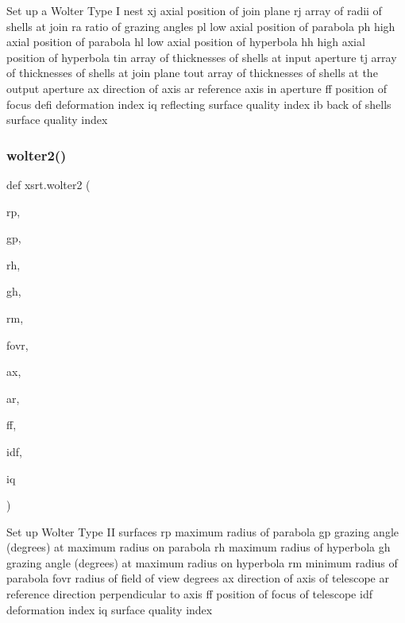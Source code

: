\begin{DoxyVerb}Set up a Wolter Type I nest
    xj      axial position of join plane
    rj      array of radii of shells at join
    ra      ratio of grazing angles
    pl      low axial position of parabola
    ph      high axial position of parabola
    hl      low axial position of hyperbola
    hh      high axial position of hyperbola
    tin     array of thicknesses of shells at input aperture
    tj      array of thicknesses of shells at join plane
    tout    array of thicknesses of shells at the output aperture
    ax      direction of axis
    ar      reference axis in aperture
    ff      position of focus
    defi    deformation index
    iq      reflecting surface quality index
    ib      back of shells surface quality index
\end{DoxyVerb}
 \mbox{\label{namespacexsrt_ac05cb537bbf56b92fea5fbe3d1809be5}} 
\subsubsection{\texorpdfstring{wolter2()}{wolter2()}}
{\footnotesize\ttfamily def xsrt.\+wolter2 (\begin{DoxyParamCaption}\item[{}]{rp,  }\item[{}]{gp,  }\item[{}]{rh,  }\item[{}]{gh,  }\item[{}]{rm,  }\item[{}]{fovr,  }\item[{}]{ax,  }\item[{}]{ar,  }\item[{}]{ff,  }\item[{}]{idf,  }\item[{}]{iq }\end{DoxyParamCaption})}

\begin{DoxyVerb}Set up Wolter Type II surfaces
    rp          maximum radius of parabola
    gp          grazing angle (degrees) at maximum radius on parabola
    rh          maximum radius of hyperbola
    gh          grazing angle (degrees) at maximum radius on hyperbola
    rm          minimum radius of parabola
    fovr        radius of field of view degrees
    ax          direction of axis of telescope
    ar          reference direction perpendicular to axis
    ff          position of focus of telescope
    idf         deformation index
    iq          surface quality index
\end{DoxyVerb}
 